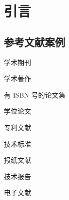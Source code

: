 %
%
%
%
%

\chapter{引言}

\section{参考文献案例}

学术期刊\cite{高景德1987交流电机的多回路理论, chen1990practical}

学术著作\cite{竺可桢物理学, aho1986compilers}

有 ISBN 号的论文集\cite{张全福1991百家争鸣}

学位论文\cite{张筑生1983微分半动力系统的不变集, 余勇1998混凝土, mh}

专利文献\cite{姜锡洲1989一种温热外敷药制备方案}

技术标准\cite{SCSF00000150, gjhjbhjkjbzs}

报纸文献\cite{JFRB202311250012}

技术报告\cite{zghlwlxxzx}

电子文献\cite{xiaoyu2001}




